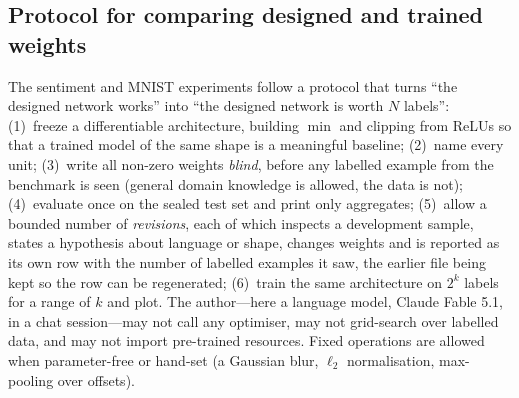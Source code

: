 \subsection{Protocol for comparing designed and trained weights}
\label{sec:protocol}

The sentiment and MNIST experiments follow a protocol that turns ``the designed
network works'' into ``the designed network is worth $N$ labels'':
(1)~freeze a differentiable architecture, building $\min$ and clipping from ReLUs so
that a trained model of the same shape is a meaningful baseline;
(2)~name every unit;
(3)~write all non-zero weights \emph{blind}, before any labelled example from the
benchmark is seen (general domain knowledge is allowed, the data is not);
(4)~evaluate once on the sealed test set and print only aggregates;
(5)~allow a bounded number of \emph{revisions}, each of which inspects a development
sample, states a hypothesis about language or shape, changes weights and is reported
as its own row with the number of labelled examples it saw, the earlier file being
kept so the row can be regenerated;
(6)~train the same architecture on $2^k$ labels for a range of $k$ and plot.
The author---here a language model, Claude Fable 5.1, in a chat session---may not
call any optimiser, may not grid-search over labelled data, and may not import
pre-trained resources. Fixed operations are allowed when parameter-free or hand-set
(a Gaussian blur, $\ell_2$ normalisation, max-pooling over offsets).
